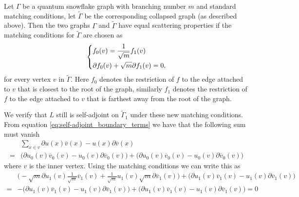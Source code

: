 \begin{proposition}
  Let $\Gamma$ be a quantum snowflake graph with branching number $m$ and standard matching conditions, let $\widetilde{\Gamma}$ be the corresponding collapsed graph (as described above). Then the two graphs $\Gamma$ and $\widetilde{\Gamma}$ have equal scattering properties if the matching conditions for $\widetilde{\Gamma}$ are chosen as
  \begin{equation}\label{eq: snowflake mc}
    \begin{dcases}
      f_0(v) = \frac{1}{\sqrt{m}} f_1(v) \\
      \partial f_0(v) + \sqrt{m} \partial f_1(v) = 0,
    \end{dcases}
  \end{equation}
  for every vertex $v$ in $\widetilde{\Gamma}$. Here $f_0$ denotes the restriction of $f$ to the edge attached to $v$ that is closest to the root of the graph, similarly $f_1$ denotes the restriction of $f$ to the edge attached to $v$ that is farthest away from the root of the graph.
\end{proposition}


We verify that $L$ still is self-adjoint on $\widetilde{\Gamma}_1$ under these new matching conditions. From equation \eqref{eq:self-adjoint_boundary_terms} we have that the following sum must vanish
\begin{align*}
  & \sum_{x \in v} \partial u(x)\overline{v}(x) - u(x)\partial\overline{v}(x) \\
  =& \Big(\partial u_0(v)\overline{v}_0(v) - u_0(v)\partial\overline{v}_0(v)\Big) + \Big(\partial u_0(v)\overline{v}_0(v) - u_0(v)\partial\overline{v}_0(v)\Big)
\end{align*}
where $v$ is the inner vertex. Using the matching conditions we can write this as
\begin{align*}
  & \Big(-\sqrt{m} \partial u_1(v)\frac{1}{\sqrt{m}}\overline{v}_1(v) + \frac{1}{\sqrt{m}}u_1(v)\sqrt{m}\partial\overline{v}_1(v)\Big) + \Big(\partial u_1(v)\overline{v}_1(v) - u_1(v)\partial\overline{v}_1(v)\Big) \\
  =& -\Big(\partial u_1(v)\overline{v}_1(v) - u_1(v)\partial\overline{v}_1(v)\Big) + \Big(\partial u_1(v)\overline{v}_1(v) - u_1(v)\partial\overline{v}_1(v)\Big) = 0
\end{align*}

